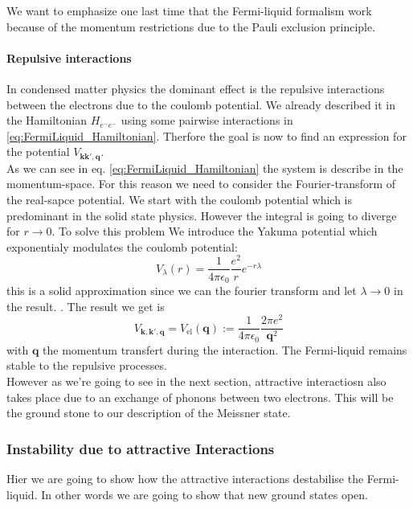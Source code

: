 \documentclass[../main.tex]{subfile}
\begin{document}
We want to emphasize one last time that the Fermi-liquid formalism work because of the momentum restrictions
due to the Pauli exclusion principle.


\paragraph{Repulsive interactions}
In condensed matter physics the dominant effect is the repulsive interactions between the electrons due to the coulomb potential. We already described it in the Hamiltonian 
$H_{e^-e^-}$ using some pairwise interactions in \ref{eq:FermiLiquid_Hamiltonian}. Therfore the goal is now to find an expression for the potential $V_{\bm{k}\bm{k}',\bm{q}}$.\\

As we can see in eq. \ref{eq:FermiLiquid_Hamiltonian} the system is describe in the momentum-space. For this reason we need to 
consider the Fourier-transform of the real-sapce potential. We start with the coulomb potential which is predominant in the solid state physics.
However the integral is going to diverge for $r\rightarrow 0$. To solve this problem We
introduce the Yakuma potential which exponentialy modulates the coulomb potential:
\begin{equation}
    V_{\lambda}(r) = \frac{1}{4\pi\epsilon_0} \frac{e^2}{r} e^{-r\lambda} \label{eq:Yakuma}
\end{equation}
this is a solid approximation since we can the fourier transform and let $\lambda\rightarrow 0$ in the result. .
The result we get is 
\begin{equation} \label{eq:Pot_repulsive_el}
    V_{\bm{k},\bm{k}',\bm{q}} = V_{\text{el}}(\bm{q}) := \frac{1}{4\pi\epsilon_0} \frac{2\pi e^2}{\bm{q}^2}
\end{equation}
with $\bm{q}$ the momentum transfert during the interaction. The Fermi-liquid remains stable to the repulsive processes.\\

However as we're going to see in the next section, attractive interactiosn also takes place due to an exchange of phonons between two electrons. This will be the 
ground stone to our description of the Meissner state.

\subsubsection{Instability due to attractive Interactions}
Hier we are going to show how the attractive interactions destabilise the Fermi-liquid. In other words we are going to show
that new ground states open.
\end{document}
